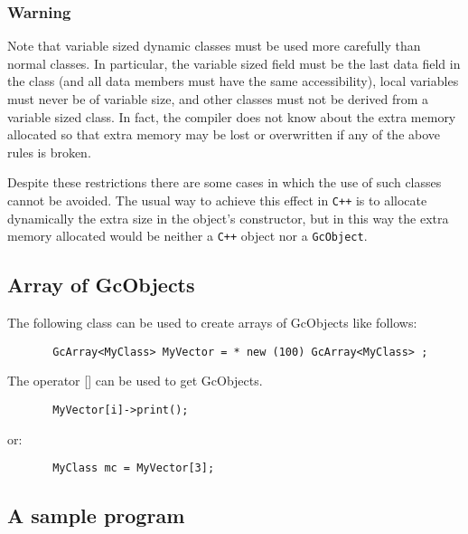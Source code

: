 \subsubsection*{Warning}

Note that variable sized dynamic classes must be used more carefully than
normal classes.  In particular, the variable sized field must be the last data
field in the class (and all data members must have the same accessibility),
local variables must never be of variable size, and other classes must not be
derived from a variable sized class.  In fact, the compiler does not know about
the extra memory allocated so that extra memory may be lost or overwritten
if any of the above rules is broken.

Despite these restrictions there are some cases in which the use of such
classes cannot be avoided. The usual way to achieve this effect in \verb|C++|
is to allocate dynamically the extra size in the object's constructor, but in
this way the extra memory allocated would be neither a \verb|C++| object nor
a \verb|GcObject|.

\subsection {Array of GcObjects}

The following class can be used to create arrays of GcObjects
like follows:

\begin{verbatim}
       GcArray<MyClass> MyVector = * new (100) GcArray<MyClass> ;
\end{verbatim}
       
The operator [] can be used to get GcObjects.

\begin{verbatim}
       MyVector[i]->print();
\end{verbatim}
or:
\begin{verbatim}
       MyClass mc = MyVector[3];
\end{verbatim}

\subsection{A sample program}

